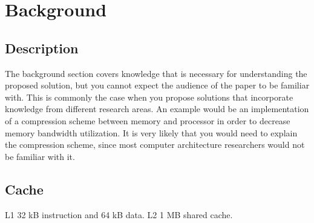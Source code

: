 \section{Background}
\label{sec:background}
\subsection{Description}
The background section covers knowledge that is necessary
for understanding the proposed solution, but you cannot expect
the audience of the paper to be familiar with. This is commonly
the case when you propose solutions that incorporate
knowledge from different research areas. An example would
be an implementation of a compression scheme between
memory and processor in order to decrease memory bandwidth
utilization. It is very likely that you would need to explain
the compression scheme, since most computer architecture
researchers would not be familiar with it.

\subsection{Cache}

L1 32 kB instruction and 64 kB data.
L2 1 MB shared cache.
